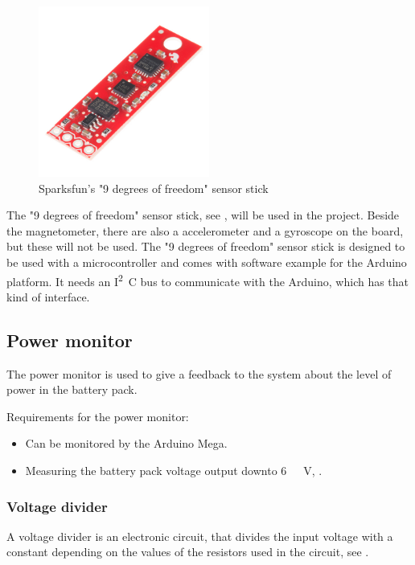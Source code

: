 \begin{figure}[H]
	\centering
	\includegraphics[width=0.50\textwidth]{figures/NineDegree.jpg}
		\caption{Sparksfun's "9 degrees of freedom" sensor stick\cite{Sparkfun9D0F} } 
	\label{NineDegree}
\end{figure}

The "9 degrees of freedom" sensor stick, see , will be used in the project. Beside the magnetometer, there are also a accelerometer and a gyroscope on the board, but these will not be used. The "9 degrees of freedom" sensor stick is designed to be used with a microcontroller and comes with software example for the Arduino platform. It needs an  \si{I^2C} bus to communicate with the Arduino, which has that kind of interface.


\subsection{Power monitor}
The power monitor is used to give a feedback to the system about the level of power in the battery pack.

Requirements for the power monitor:
\begin{itemize}
\item Can be monitored by the Arduino Mega.
\item Measuring the battery pack voltage output downto \si{6\ V}, .
\end{itemize}

\subsubsection{Voltage divider}
A voltage divider is an electronic circuit, that divides the input voltage with a constant depending on the values of the resistors used in the circuit, see .

